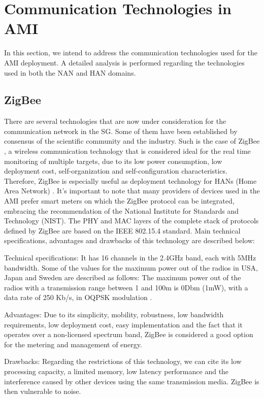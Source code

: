 \documentclass[11pt,final,onecolumn]{IEEEtran}
\begin{document}
\section{Communication Technologies in AMI}\label{technologies}

In this section, we intend to address the communication technologies used for the AMI deployment. A detailed analysis is performed regarding the technologies used in both the NAN and HAN domains.

\subsection{ZigBee}

There are several technologies that are now under consideration for the communication network in the SG. Some of them have been established by consensus of the scientific community and the industry. Such is the case of ZigBee \cite{Alliance2010}, a wireless communication technology that is considered ideal for the real time monitoring of multiple targets, due to its low power consumption, low deployment cost, self-organization and self-configuration characteristics. Therefore, ZigBee is especially useful as deployment technology for HANs (Home Area Network) \cite{Sabbah2014}. It’s important to note that many providers of devices used in the AMI prefer smart meters on which the ZigBee protocol can be integrated, embracing the recommendation of the National Institute for Standards and Technology (NIST). The PHY and MAC layers of the complete stack of protocols defined by ZigBee are based on the IEEE 802.15.4 standard. Main technical specifications, advantages and drawbacks of this technology are described below:

Technical specifications: It has 16 channels in the 2.4GHz band, each with 5MHz bandwidth. Some of the values for the maximum power out of the radios in USA, Japan and Sweden are described as follows: The maximum power out of the radios with a transmission range between 1 and 100m is 0Dbm (1mW), with a data rate of 250 Kb/s, in OQPSK modulation \cite{Sabbah2014}.

Advantages: Due to its simplicity, mobility, robustness, low bandwidth requirements, low deployment cost, easy implementation and the fact that it operates over a non-licensed spectrum band, ZigBee is considered a good option for the metering and management of energy.

Drawbacks: Regarding the restrictions of this technology, we can cite its low processing capacity, a limited memory, low latency performance and the interference caused by other devices using the same transmission media. ZigBee is then vulnerable to noise.
\end{document}
